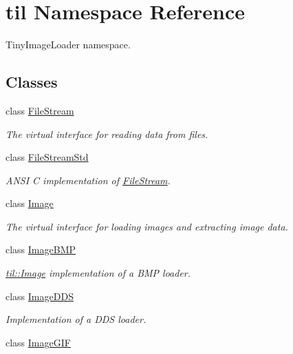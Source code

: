 \hypertarget{namespacetil}{
\section{til Namespace Reference}
\label{namespacetil}
}


TinyImageLoader namespace.  


\subsection*{Classes}
\begin{DoxyCompactItemize}
\item 
class \hyperlink{classtil_1_1_file_stream}{FileStream}
\begin{DoxyCompactList}\small\item\em The virtual interface for reading data from files. \item\end{DoxyCompactList}\item 
class \hyperlink{classtil_1_1_file_stream_std}{FileStreamStd}
\begin{DoxyCompactList}\small\item\em ANSI C implementation of \hyperlink{classtil_1_1_file_stream}{FileStream}. \item\end{DoxyCompactList}\item 
class \hyperlink{classtil_1_1_image}{Image}
\begin{DoxyCompactList}\small\item\em The virtual interface for loading images and extracting image data. \item\end{DoxyCompactList}\item 
class \hyperlink{classtil_1_1_image_b_m_p}{ImageBMP}
\begin{DoxyCompactList}\small\item\em \hyperlink{classtil_1_1_image}{til::Image} implementation of a BMP loader. \item\end{DoxyCompactList}\item 
class \hyperlink{classtil_1_1_image_d_d_s}{ImageDDS}
\begin{DoxyCompactList}\small\item\em Implementation of a DDS loader. \item\end{DoxyCompactList}\item 
class \hyperlink{classtil_1_1_image_g_i_f}{ImageGIF}

\end{DoxyCompactItemize}
